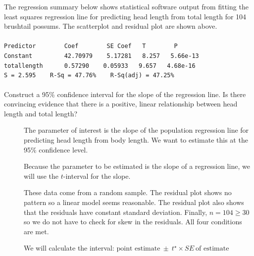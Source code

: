 \begin{examplewrap}
\begin{nexample}{


The regression summary below shows statistical software output from fitting the least squares regression line for predicting head length from total length for 104 brushtail possums.  The scatterplot and residual plot are shown above. 
\\
\\
\texttt{Predictor \ \ \ \ \ \ \ Coef \ \ \ \ \ \ \ SE Coef \ \ T \ \ \ \ \ \ \ P} \\
\texttt{Constant \ \ \ \ \ \ \ \  42.70979 \ \ \ 5.17281 \ \ 8.257 \ \ 5.66e-13} \\
\texttt{total\us{}length\ \ \ \ \ \ 0.57290 \ \ \ 0.05933 \ \ 9.657 \ \ 4.68e-16} \\[-2mm]

\texttt{S = 2.595\ \ \ \ R-Sq = 47.76\% \ \ \ R-Sq(adj) = 47.25\%}
\\
\\
Construct a 95\% confidence interval for the slope of the regression line.  Is there convincing evidence that there is a positive, linear relationship between head length and total length? %
}
\begin{description}
\item[] The parameter of interest is the slope of the population regression line for predicting head length from body length.  We want to estimate this at the 95\% confidence level.  
\item[] Because the parameter to be estimated is the slope of a regression line, we will use the $t$-interval for the slope.
\item[] These data come from a random sample.  The residual plot shows no pattern so a linear model seems reasonable.  The residual plot also shows that the residuals have constant standard deviation.  Finally, $n=104\ge 30$ so we do not have to check for skew in the residuals.  All four conditions are met.
\item[]  We will calculate the interval:
$\text{point estimate}\ \pm\ t^{\star} \times SE\ \text{of estimate}$


\end{description}
\end{nexample}
\end{examplewrap}
